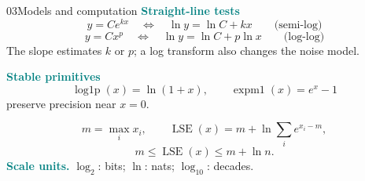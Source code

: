 \documentclass[a4paper,landscape]{article}
\newcommand{\term}[1]{\textcolor{Teal}{\bfseries #1}}
\newcommand{\divider}{\par\vspace{1.25mm}{\color{Rule}\hrule height .3pt}\vspace{1.25mm}}
\begin{document}
\begin{minipage}[t]{.3225\textwidth}
\vspace{0pt}
\begin{infocard}{03}{Models and computation}
  \term{Straight-line tests}
  \[
    y=Ce^{kx}
    \quad\Longleftrightarrow\quad
    \ln y=\ln C+kx
    \qquad\text{(semi-log)}
  \]
  \[
    y=Cx^p
    \quad\Longleftrightarrow\quad
    \ln y=\ln C+p\ln x
    \qquad\text{(log-log)}
  \]
  The slope estimates \(k\) or \(p\); a log transform also changes the
  noise model.

  \vspace{1.4mm}
  \divider
  \term{Stable primitives}
  \[
    \operatorname{log1p}(x)=\ln(1+x),\qquad
    \operatorname{expm1}(x)=e^x-1
  \]
  preserve precision near \(x=0\).

  \vspace{1.3mm}
  \[
    m=\max_i x_i,\qquad
    \operatorname{LSE}(x)
    =m+\ln\sum_i e^{x_i-m},
  \]
  \[
    m\le\operatorname{LSE}(x)\le m+\ln n.
  \]
  \vspace{1.2mm}
  \term{Scale units.}
  \(\log_2\): bits; \(\ln\): nats; \(\log_{10}\): decades.
\end{infocard}
\end{minipage}

\vspace{2mm}
\end{document}

